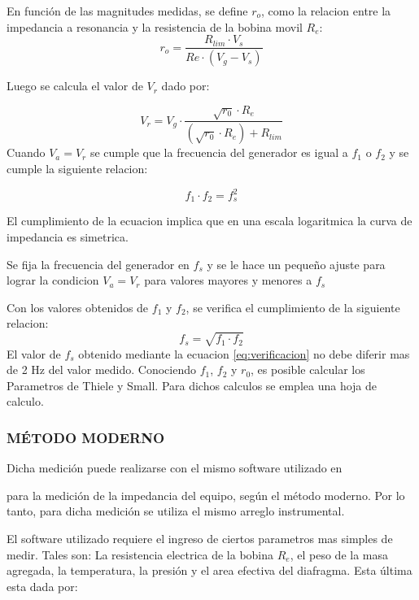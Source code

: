 \documentclass[]{article}
\begin{document}
\begin{multicols}{2}
En función de las magnitudes medidas, se define $r_o$, como la relacion entre
la impedancia a resonancia y la resistencia de la bobina movil $R_e$:
\begin{equation}
  r_{o}=\frac{R_{lim} \cdot V_s}{Re \cdot (V_g-V_s)}
  \label{eq:ro}
\end{equation}

Luego se calcula el valor de $V_r$ dado por:

\begin{equation}
V_r = V_g \cdot \frac{\sqrt{r_0} \cdot R_e }{\left(\sqrt{r_0} \cdot R_e \right) + R_{lim}}
\end{equation}
Cuando $V_a=V_r$ se cumple que la frecuencia del generador es igual a $f_1$ o
 $f_2$  y se cumple la siguiente relacion:

\begin{equation}
  f_1 \cdot f_2 = f_s^2
  \label{eqf1f2}
\end{equation}

El cumplimiento de la ecuacion
 implica que en una escala logaritmica
la curva de impedancia es simetrica.

Se fija la frecuencia del generador en $f_s$ y se le hace un pequeño ajuste
para lograr la condicion $V_a=V_r$ para valores mayores y menores a $f_s$

Con los valores obtenidos de $f_1$ y $f_2$, se verifica el cumplimiento de la
siguiente relacion:
\begin{equation}
  f_s=\sqrt{f_1\cdot f_2}
  \label{eq:verificacion}
\end{equation}
El valor de $f_s$ obtenido mediante la ecuacion \ref{eq:verificacion} no debe
diferir mas de 2 Hz del valor medido.
Conociendo $f_1$, $f_2$ y $r_0$, es posible calcular los Parametros de Thiele y
Small. Para dichos calculos se emplea una hoja de calculo.

\subsubsection{MÉTODO MODERNO}
Dicha medición puede realizarse con el mismo software utilizado en


para la medición de la impedancia del equipo, según el
método moderno. Por lo tanto, para dicha medición se utiliza el mismo
arreglo instrumental.

El software utilizado requiere el ingreso de ciertos parametros mas simples
de medir. Tales son: La resistencia electrica de la bobina $R_e$, el peso de
la masa agregada, la temperatura, la presión y el area efectiva del diafragma.
Esta última esta dada por:


\end{multicols}
\end{document}
